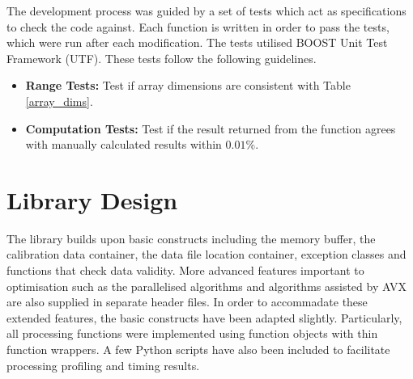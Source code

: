 \documentclass[journal]{IEEEtran}
\begin{document}
The development process was guided by a set of tests which act as specifications to check the code against. Each function is written in order to pass the tests, which were run after each modification. The tests utilised BOOST Unit Test Framework (UTF)\cite{BOOST}. These tests follow the following guidelines.
\begin{itemize}
 \item \textbf{Range Tests:} Test if array dimensions are consistent with Table \ref{array_dims}.
 \item \textbf{Computation Tests:} Test if the result returned from the function agrees with manually calculated results within $0.01\%$.	
\end{itemize}

\section{Library Design}	%
The library builds upon basic constructs including the memory buffer, the calibration data container, the data file location container, exception classes and functions that check data validity. More advanced features important to optimisation such as the parallelised algorithms and algorithms assisted by AVX are also supplied in separate header files. In order to accommadate these extended features, the basic constructs have been adapted slightly. Particularly, all processing functions were implemented using function objects with thin function wrappers. A few Python scripts have also been included to facilitate processing profiling and timing results.
\end{document}
